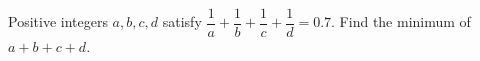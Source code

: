 Positive integers $a,b,c,d$ satisfy $\dfrac{1}{a}+\dfrac{1}{b}+\dfrac{1}{c}+\dfrac{1}{d}=0.7$. Find the minimum of $a+b+c+d$.
